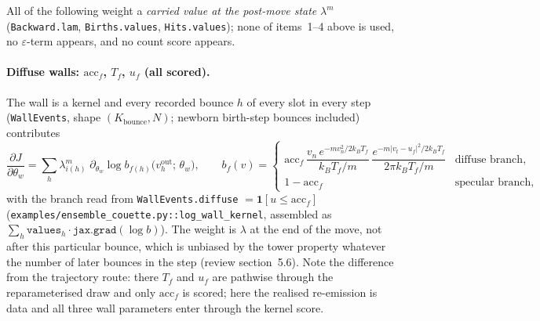 \documentclass[11pt,a4paper]{article}
\numberwithin{equation}{section}
\newcommand{\ind}{\mathbf{1}}
\newcommand{\code}[1]{\texttt{#1}}
\begin{document}
All of the following weight a \emph{carried value at the post-move state} $\lambda^m$
(\code{Backward.lam}, \code{Births.values}, \code{Hits.values}); none of items~1--4
above is used, no $\varepsilon$-term appears, and no count score appears.

\paragraph{Diffuse walls: $\mathrm{acc}_f$, $T_f$, $u_f$ (all scored).}
The wall is a kernel and every recorded bounce $h$ of every slot in every step
(\code{WallEvents}, shape $(K_{\mathrm{bounce}}, N)$; newborn birth-step bounces included)
contributes
\begin{equation}
\label{eq:wall-score}
\frac{\partial J}{\partial \theta_w} = \sum_{h} \lambda^m_{i(h)}\; \partial_{\theta_w} \log b_{f(h)}\big(v^{\mathrm{out}}_h;\, \theta_w\big),
\qquad
b_f(v) =
\begin{cases}
\mathrm{acc}_f\, \dfrac{v_n\, e^{-m v_n^2/2k_BT_f}}{k_B T_f/m}\, \dfrac{e^{-m|v_t - u_f|^2/2k_BT_f}}{2\pi k_B T_f/m} & \text{diffuse branch},\\[2ex]
1 - \mathrm{acc}_f & \text{specular branch},
\end{cases}
\end{equation}
with the branch read from \code{WallEvents.diffuse} $= \ind[u \le \mathrm{acc}_f]$
(\code{examples/ensemble\_couette.py::log\_wall\_kernel}, assembled as
$\sum_h \code{values}_h \cdot \code{jax.grad}(\log b)$).  The weight is $\lambda$ at
the end of the move, not after this particular bounce, which is unbiased by the tower
property whatever the number of later bounces in the step (review section~5.6).
Note the difference from the trajectory route: there $T_f$ and $u_f$ are pathwise
through the reparameterised draw and only $\mathrm{acc}_f$ is scored; here the realised
re-emission is data and all three wall parameters enter through the kernel score.
\end{document}
